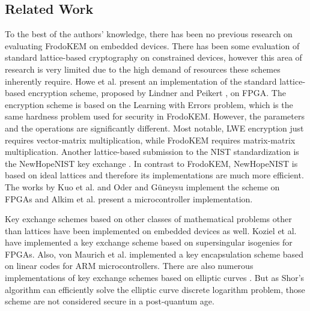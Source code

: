 \subsection{Related Work}

To the best of the authors' knowledge, there has been no previous research on evaluating \textsf{FrodoKEM} on embedded devices. There has been some evaluation of standard lattice-based cryptography on constrained devices, however this area of research is very limited due to the high demand of resources these schemes inherently require. Howe et al. \cite{DBLP:conf/dac/HoweMORGB16} present an implementation of the standard lattice-based encryption scheme, proposed by Lindner and Peikert \cite{DBLP:conf/ctrsa/LindnerP11}, on FPGA. The encryption scheme is based on the Learning with Errors problem, which is the same hardness problem used for security in \textsf{FrodoKEM}. However, the parameters and the operations are significantly different. Most notable, LWE encryption just requires vector-matrix multiplication, while \textsf{FrodoKEM} requires matrix-matrix multiplication. Another lattice-based submission to the NIST standardization is the \textsf{NewHopeNIST} key exchange \cite{DBLP:conf/uss/AlkimDPS16,NISTPQC-R1:NewHope17}. In contrast to \textsf{FrodoKEM}, \textsf{NewHopeNIST} is based on ideal lattices and therefore its implementations are much more efficient. The works by Kuo et al. \cite{cryptoeprint:2017:690} and Oder and G{\"u}neysu \cite{oder2017implementing} implement the scheme on FPGAs and Alkim et al. \cite{alkim2016newhope} present a microcontroller implementation.

Key exchange schemes based on other classes of mathematical problems other than lattices have been implemented on embedded devices as well. Koziel et al. \cite{DBLP:conf/indocrypt/KozielAK16} have implemented a key exchange scheme based on supersingular isogenies for FPGAs. Also, von Maurich et al. \cite{DBLP:conf/pqcrypto/MaurichHG16} implemented a key encapsulation scheme based on linear codes for ARM microcontrollers. There are also numerous implementations of key exchange schemes based on elliptic curves \cite{DBLP:conf/tsp/RasoMFPK15, DBLP:conf/ccs/0001SHHG15, DBLP:journals/dcc/DullHHHPSS15}. But as Shor's algorithm \cite{DBLP:conf/focs/Shor94} can efficiently solve the elliptic curve discrete logarithm problem, those scheme are not considered secure in a post-quantum age.


